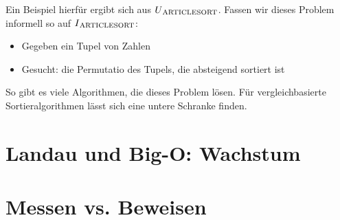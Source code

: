Ein Beispiel hierfür ergibt sich aus $U\textsubscript{ARTICLESORT}$.
Fassen wir dieses Problem informell so auf $I\textsubscript{ARTICLESORT}$:
\begin{itemize}
    \item Gegeben ein Tupel von Zahlen
    \item Gesucht: die Permutatio des Tupels, die absteigend sortiert ist
\end{itemize}
So gibt es viele Algorithmen, die dieses Problem lösen.
Für vergleichbasierte Sortieralgorithmen lässt sich eine untere Schranke finden. 
\section{Landau und Big-O: Wachstum}
\section{Messen vs. Beweisen}\label{messenVsBeweisen}

